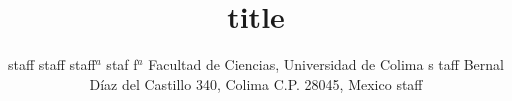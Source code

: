 \documentclass[11pt]{article}
\begin{document}
  
    \author{   staff   staff   staff$^a$   staf
f\normalsize{$^a$ Facultad de Ciencias, Universidad de Colima}   s
taff\vspace{0.3cm}
\normalsize{Bernal D\'iaz del Castillo 340, Colima C.P. 28045, Mexico}   staff}

    \title{   title}

    \maketitle


  
\end{document}
